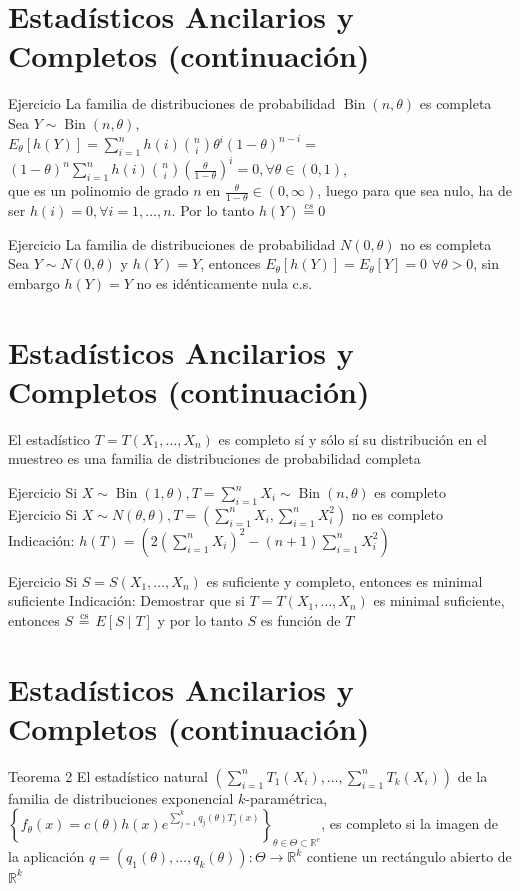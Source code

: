 \section*{Estadísticos Ancilarios y Completos (continuación)}
Ejercicio La familia de distribuciones de probabilidad $\operatorname{Bin}(n, \theta)$ es completa\\
Sea $Y \sim \operatorname{Bin}(n, \theta)$,\\
$E_{\theta}[h(Y)]=\sum_{i=1}^{n} h(i)\binom{n}{i} \theta^{i}(1-\theta)^{n-i}=$\\
$(1-\theta)^{n} \sum_{i=1}^{n} h(i)\binom{n}{i}\left(\frac{\theta}{1-\theta}\right)^{i}=0, \forall \theta \in(0,1)$,\\
que es un polinomio de grado $n$ en $\frac{\theta}{1-\theta} \in(0, \infty)$, luego para que sea nulo, ha de ser $h(i)=0, \forall i=1, \ldots, n$. Por lo tanto $h(Y) \stackrel{c s}{=} 0$

Ejercicio La familia de distribuciones de probabilidad $N(0, \theta)$ no es completa\\
Sea $Y \sim N(0, \theta)$ y $h(Y)=Y$, entonces $E_{\theta}[h(Y)]=E_{\theta}[Y]=0$ $\forall \theta>0$, sin embargo $h(Y)=Y$ no es idénticamente nula c.s.

\section*{Estadísticos Ancilarios y Completos (continuación)}
El estadístico $T=T\left(X_{1}, \ldots, X_{n}\right)$ es completo sí y sólo sí su distribución en el muestreo es una familia de distribuciones de probabilidad completa

Ejercicio Si $X \sim \operatorname{Bin}(1, \theta), T=\sum_{i=1}^{n} X_{i} \sim \operatorname{Bin}(n, \theta)$ es completo\\
Ejercicio Si $X \sim N(\theta, \theta), T=\left(\sum_{i=1}^{n} X_{i}, \sum_{i=1}^{n} X_{i}^{2}\right)$ no es completo Indicación: $h(T)=\left(2\left(\sum_{i=1}^{n} X_{i}\right)^{2}-(n+1) \sum_{i=1}^{n} X_{i}^{2}\right)$

Ejercicio Si $S=S\left(X_{1}, \ldots, X_{n}\right)$ es suficiente y completo, entonces es minimal suficiente Indicación: Demostrar que si $T=T\left(X_{1}, \ldots, X_{n}\right)$ es minimal suficiente, entonces $S \stackrel{\text { cs }}{=} E[S \mid T]$ y por lo tanto $S$ es función de $T$

\section*{Estadísticos Ancilarios y Completos (continuación)}
Teorema 2 El estadístico natural $\left(\sum_{i=1}^{n} T_{1}\left(X_{i}\right), \ldots, \sum_{i=1}^{n} T_{k}\left(X_{i}\right)\right)$ de la familia de distribuciones exponencial $k$-paramétrica, $\left\{f_{\theta}(x)=c(\theta) h(x) e^{\sum_{j=1}^{k} q_{j}(\theta) T_{j}(x)}\right\}_{\theta \in \Theta \subset \mathbb{R}^{e}}$, es completo si la imagen de la aplicación $q=\left(q_{1}(\theta), \ldots, q_{k}(\theta)\right): \Theta \longrightarrow \mathbb{R}^{k}$ contiene un rectángulo abierto de $\mathbb{R}^{k}$

